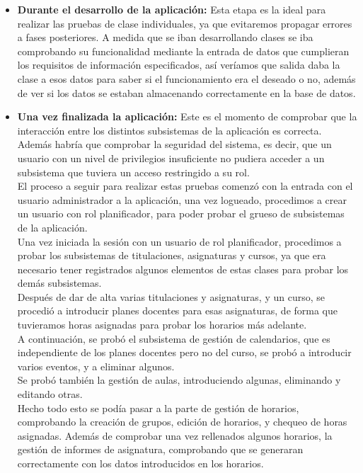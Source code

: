 \begin{itemize}
\item {\bf Durante el desarrollo de la aplicación:} Esta etapa es la ideal para realizar las pruebas de clase individuales, ya que evitaremos propagar errores a fases posteriores. A medida que se iban desarrollando clases se iba comprobando su funcionalidad mediante la entrada de datos que cumplieran los requisitos de información especificados, así veríamos que salida daba la clase a esos datos para saber si el funcionamiento era el deseado o no, además de ver si los datos se estaban almacenando correctamente en la base de datos.

\item {\bf Una vez finalizada la aplicación:} Este es el momento de comprobar que la interacción entre los distintos subsistemas de la aplicación es correcta. Además habría que comprobar la seguridad del sistema, es decir, que un usuario con un nivel de privilegios insuficiente no pudiera acceder a un subsistema que tuviera un acceso restringido a su rol.\\

El proceso a seguir para realizar estas pruebas comenzó con la entrada con el usuario administrador a la aplicación, una vez logueado, procedimos a crear un usuario con rol planificador, para poder probar el grueso de subsistemas de la aplicación.\\

Una vez iniciada la sesión con un usuario de rol planificador, procedimos a probar los subsistemas de titulaciones, asignaturas y cursos, ya que era necesario tener registrados algunos elementos de estas clases para probar los demás subsistemas.\\

Después de dar de alta varias titulaciones y asignaturas, y un curso, se procedió a introducir planes docentes para esas asignaturas, de forma que tuvieramos horas asignadas para probar los horarios más adelante.\\

A continuación, se probó el subsistema de gestión de calendarios, que es independiente de los planes docentes pero no del curso, se probó a introducir varios eventos, y a eliminar algunos.\\

Se probó también la gestión de aulas, introduciendo algunas, eliminando y editando otras.\\

Hecho todo esto se podía pasar a la parte de gestión de horarios, comprobando la creación de grupos, edición de horarios, y chequeo de horas asignadas. Además de comprobar una vez rellenados algunos horarios, la gestión de informes de asignatura, comprobando que se generaran correctamente con los datos introducidos en los horarios.\\


\end{itemize}
